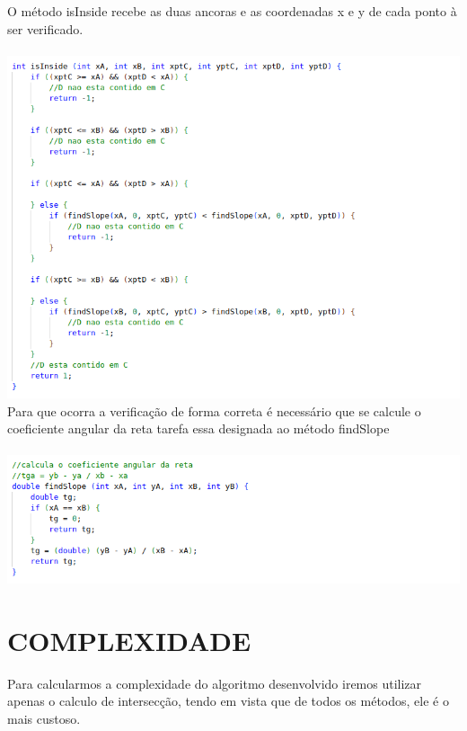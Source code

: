 \documentclass[12pt]{article}
\begin{document}
            O método isInside recebe as duas ancoras e as coordenadas x e y de cada ponto à ser verificado. \\\\
            \includegraphics[width=1.0\linewidth]{Figuras/4.png}\\
            Para que ocorra a verificação de forma correta é necessário que se calcule o coeficiente angular da reta
            tarefa essa designada ao método findSlope\\\\
            \includegraphics[width=1.0\linewidth]{Figuras/3.png}\\

    \newpage
    \section{COMPLEXIDADE}
        Para calcularmos a complexidade do algoritmo desenvolvido iremos utilizar apenas o 
        calculo de intersecção, tendo em vista que de todos os métodos, ele é o mais custoso. 
       
\end{document}
